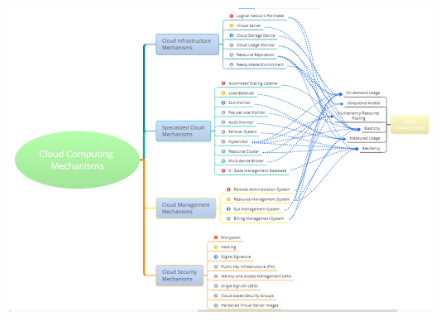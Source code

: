 \begin{figure}[ht]
    \centering
    \includegraphics[width=12cm]{./Images/cap9/9.1.png}
\end{figure}

